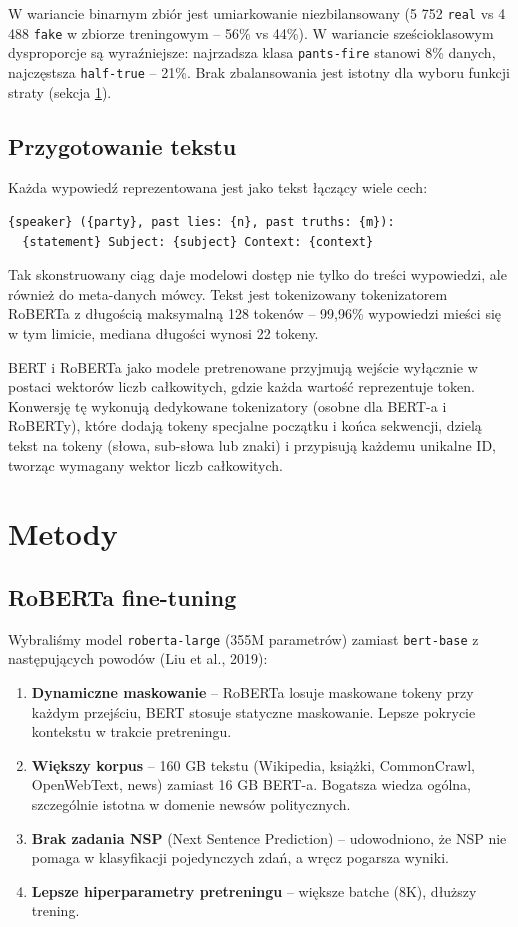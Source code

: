 \documentclass[11pt,a4paper]{article}
\begin{document}
W wariancie binarnym zbiór jest umiarkowanie niezbilansowany (5 752 \texttt{real}
vs 4 488 \texttt{fake} w zbiorze treningowym -- 56\% vs 44\%). W wariancie
sześcioklasowym dysproporcje są wyraźniejsze: najrzadsza klasa \texttt{pants-fire}
stanowi 8\% danych, najczęstsza \texttt{half-true} -- 21\%. Brak zbalansowania
jest istotny dla wyboru funkcji straty (sekcja \ref{sec:methods}).

\subsection{Przygotowanie tekstu}

Każda wypowiedź reprezentowana jest jako tekst łączący wiele cech:
\begin{verbatim}
{speaker} ({party}, past lies: {n}, past truths: {m}):
  {statement} Subject: {subject} Context: {context}
\end{verbatim}
Tak skonstruowany ciąg daje modelowi dostęp nie tylko do treści wypowiedzi, ale
również do meta-danych mówcy. Tekst jest tokenizowany tokenizatorem RoBERTa
z długością maksymalną 128 tokenów -- 99{,}96\% wypowiedzi mieści się w tym
limicie, mediana długości wynosi 22 tokeny.

BERT i RoBERTa jako modele pretrenowane przyjmują wejście wyłącznie w postaci
wektorów liczb całkowitych, gdzie każda wartość reprezentuje token. Konwersję
tę wykonują dedykowane tokenizatory (osobne dla BERT-a i RoBERTy), które
dodają tokeny specjalne początku i końca sekwencji, dzielą tekst na tokeny
(słowa, sub-słowa lub znaki) i przypisują każdemu unikalne ID, tworząc
wymagany wektor liczb całkowitych.

\section{Metody}\label{sec:methods}

\subsection{RoBERTa fine-tuning}

Wybraliśmy model \texttt{roberta-large} (355M parametrów) zamiast \texttt{bert-base}
z następujących powodów (Liu et al., 2019):
\begin{enumerate}
  \item \textbf{Dynamiczne maskowanie} -- RoBERTa losuje maskowane tokeny przy
        każdym przejściu, BERT stosuje statyczne maskowanie. Lepsze pokrycie
        kontekstu w trakcie pretreningu.
  \item \textbf{Większy korpus} -- 160 GB tekstu (Wikipedia, książki, CommonCrawl,
        OpenWebText, news) zamiast 16 GB BERT-a. Bogatsza wiedza ogólna,
        szczególnie istotna w domenie newsów politycznych.
  \item \textbf{Brak zadania NSP} (Next Sentence Prediction) -- udowodniono, że
        NSP nie pomaga w klasyfikacji pojedynczych zdań, a wręcz pogarsza wyniki.
  \item \textbf{Lepsze hiperparametry pretreningu} -- większe batche (8K), dłuższy
        trening.
\end{enumerate}
\end{document}

